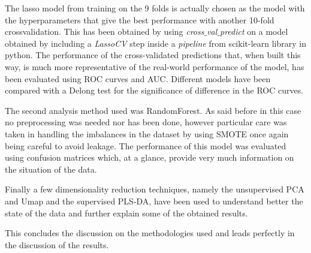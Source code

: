 The lasso model from training on the 9 folds is actually chosen as the model with the hyperparameters that give the best performance with another 10-fold crossvalidation. This has been obtained by using \textit{cross$\_$val$\_$predict} on a model obtained by including a \textit{LassoCV} step inside a \textit{pipeline} from scikit-learn library in python. The performance of the cross-validated predictions that, when built this way, is much more representative of the real-world performance of the model, has been evaluated using ROC curves and AUC.
Different models have been compared with a Delong test\cite{Delong} for the significance of difference in the ROC curves.

The second analysis method used was RandomForest. As said before in this case no preprocessing was needed nor has been done, however particular care was taken in handling the imbalances in the dataset by using SMOTE \cite{SMOTE} once again being careful to avoid leakage. The performance of this model was evaluated using confusion matrices which, at a glance, provide very much information on the situation of the data.

Finally a few dimensionality reduction techniques, namely the unsupervised PCA\cite{PCA} and Umap \cite{UMAP} and the supervised PLS-DA\cite{PLSDA}, have been used to understand better the state of the data and further explain some of the obtained results.

This concludes the discussion on the methodologies used and leads perfectly in the discussion of the results.













